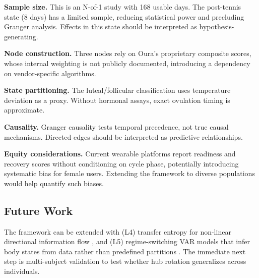 \documentclass[letterpaper]{article}
\begin{document}
\textbf{Sample size.} This is an N-of-1 study with 168 usable days. The post-tennis state (8 days) has a limited sample, reducing statistical power and precluding Granger analysis. Effects in this state should be interpreted as hypothesis-generating.

\textbf{Node construction.} Three nodes rely on Oura's proprietary composite scores, whose internal weighting is not publicly documented, introducing a dependency on vendor-specific algorithms.

\textbf{State partitioning.} The luteal/follicular classification uses temperature deviation as a proxy. Without hormonal assays, exact ovulation timing is approximate.

\textbf{Causality.} Granger causality tests temporal precedence, not true causal mechanisms. Directed edges should be interpreted as predictive relationships.

\textbf{Equity considerations.} Current wearable platforms report readiness and recovery scores without conditioning on cycle phase, potentially introducing systematic bias for female users. Extending the framework to diverse populations would help quantify such biases.

\subsection{Future Work}

The framework can be extended with (L4) transfer entropy for non-linear directional information flow \citep{schreiber2000}, and (L5) regime-switching VAR models that infer body states from data rather than predefined partitions \citep{hamilton1989}. The immediate next step is multi-subject validation to test whether hub rotation generalizes across individuals.




\end{document}
